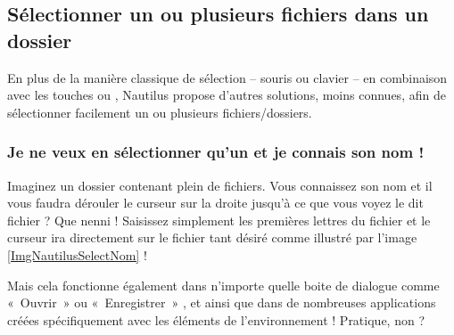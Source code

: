 \subsection{Sélectionner un ou plusieurs fichiers dans un dossier}
En plus de la manière classique de sélection -- souris ou clavier -- en combinaison avec les touches  ou , Nautilus propose d'autres solutions, moins connues, afin de sélectionner facilement un ou plusieurs fichiers/dossiers.
\subsubsection{Je ne veux en sélectionner qu'un et je connais son nom !}
Imaginez un dossier contenant plein de fichiers. Vous connaissez son nom et il vous faudra dérouler le curseur sur la droite jusqu'à ce que vous voyez le dit fichier ? Que nenni ! Saisissez simplement les premières lettres du fichier et le curseur ira directement sur le fichier tant désiré comme illustré par l'image \ref{ImgNautilusSelectNom} !
\begin{nota}
Mais cela fonctionne également dans n'importe quelle boite de dialogue comme «~Ouvrir~» ou «~Enregistrer~» , et ainsi que dans de nombreuses applications créées spécifiquement avec les éléments de l'environnement  ! Pratique, non ?
\end{nota}
